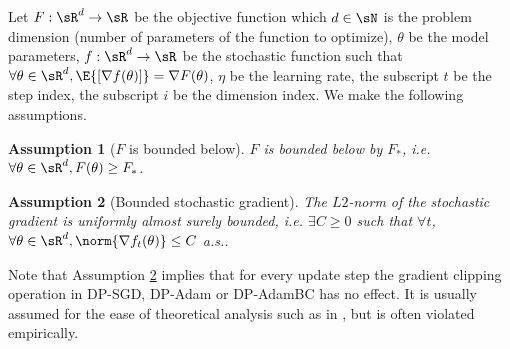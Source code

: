 \documentclass[letterpaper]{article} %
\newtheorem{assumption}{Assumption}
\begin{document}
Let $F: \sR^d \rightarrow \sR$ be the objective function which $d \in \sN$ is the problem dimension (number of parameters of the function to optimize), $\theta$ be the model parameters, $f: \sR^d \rightarrow \sR$ be the stochastic function such that $\forall \theta \in \sR^{d}, \E{[\nabla f(\theta)]} = \nabla F(\theta)$, $\eta$ be the learning rate, the subscript $t$ be the step index, the subscript $i$ be the dimension index. We make the following assumptions.

\begin{assumption}[$F$ is bounded below]
\label{assmption:f_bounded_below}
$F$ is bounded below by $F_*$, i.e. $\forall \theta \in \sR^{d}, F(\theta) \geq F_*$.
\end{assumption}

\begin{assumption}[Bounded stochastic gradient]
\label{assmption:bounded_stochastic_grad}
The $L2$-norm of the stochastic gradient is uniformly almost surely bounded, i.e. $\exists C \geq 0$ such that $\forall t$, $\forall \theta \in \sR^{d}, \norm{\nabla f_t(\theta)} \leq C$ a.s..
\end{assumption}
Note that Assumption \ref{assmption:bounded_stochastic_grad} implies that for every update step the gradient clipping operation in DP-SGD, DP-Adam or DP-AdamBC has no effect. It is usually assumed for the ease of theoretical analysis such as in \citet{li2023dp2}, but is often violated empirically.
\end{document}
